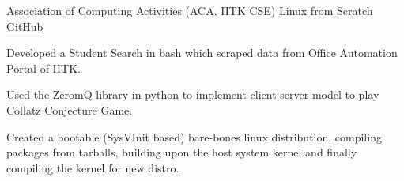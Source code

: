 \begin{cventries}

  \cventry
  {Association of Computing Activities (ACA, IITK CSE)}
  {Linux from Scratch}
  {\href{https://github.com/mayanksha/lfs}{\faGithubSquare\acvHeaderIconSep GitHub}}
  {}
  {
    \begin{cvitems}
    \item Developed a Student Search in bash which scraped data from Office Automation Portal of IITK.
    \item Used the ZeromQ library in python to implement client server model to play Collatz Conjecture Game.
    \item Created a bootable (SysVInit based) bare-bones linux distribution, compiling packages from tarballs, building upon the host system kernel and finally compiling the kernel for new distro.
    \end{cvitems}
  }


\end{cventries}

